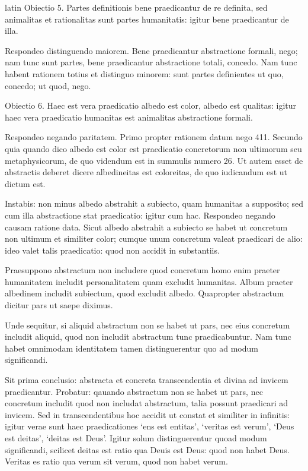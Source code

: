 \begin{otherlanguage*}{latin}
\pstart
  Obiectio 5. Partes definitionis bene praedicantur de re definita, sed animalitas et rationalitas sunt partes humanitatis: igitur bene praedicantur de illa. 
\pend

\pstart
   Respondeo distinguendo maiorem. Bene praedicantur abstractione formali, nego; nam tunc sunt partes, bene praedicantur abstractione totali, concedo. Nam tunc habent rationem totius et distinguo minorem: sunt partes definientes ut quo, concedo; ut quod, nego. 
\pend

\pstart
  Obiectio 6. Haec est vera praedicatio albedo est color, albedo est qualitas: igitur haec vera praedicatio humanitas est animalitas abstractione formali. 
\pend

\pstart
   Respondeo negando paritatem. Primo propter rationem datum nego 411. Secundo quia quando dico albedo est color est praedicatio concretorum non ultimorum seu metaphysicorum, de quo videndum est in summulis numero 26. Ut autem esset de abstractis deberet dicere albedineitas est coloreitas, de quo iudicandum est ut dictum est. 
\pend

\pstart
  Instabis: non minus albedo abstrahit a subiecto, quam humanitas a supposito; sed cum illa abstractione stat praedicatio: igitur cum hac. Respondeo negando causam ratione data. Sicut albedo abstrahit a subiecto se habet ut concretum non ultimum et similiter color; cumque unum concretum valeat praedicari de alio: ideo valet talis praedicatio: quod non accidit in substantiis. 
\pend

        \pstart
        \pend
      
\pstart
  Praesuppono abstractum non includere quod concretum homo enim praeter humanitatem includit personalitatem quam excludit humanitas. Album praeter albedinem includit subiectum, quod excludit albedo. Quapropter abstractum dicitur pars ut saepe diximus. 
\pend

\pstart
  Unde sequitur, si aliquid abstractum non se habet ut pars, nec eius concretum includit aliquid, quod non includit abstractum tunc praedicabuntur. Nam tunc habet omnimodam identitatem tamen distinguerentur quo ad modum significandi. 
\pend

\pstart
  Sit prima conclusio: abstracta et concreta transcendentia et divina ad invicem praedicantur. Probatur: qauando abstractum non se habet ut pars, nec concretum includit quod non includat abstractum, talia possunt praedicari ad invicem. Sed in transcendentibus hoc accidit ut constat et similiter in infinitis: igitur verae sunt haec praedicationes `ens est entitas', `veritas est verum', `Deus est deitas', `deitas est Deus'. Igitur solum distinguerentur quoad modum significandi, scilicet deitas est ratio qua Deuis est Deus: quod non habet Deus. Veritas es ratio qua verum sit verum, quod non habet verum. 
\pend


\end{otherlanguage*}

